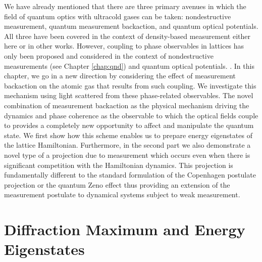 We have already mentioned that there are three primary avenues in
which the field of quantum optics with ultracold gases can be taken:
nondestructive measurement, quantum measurement backaction, and
quantum optical potentials. All three have been covered in the context
of density-based measurement either here or in other works. However,
coupling to phase observables in lattices has only been proposed and
considered in the context of nondestructive measurements (see Chapter
\ref{chap:qnd}) and quantum optical potentials. \cite{caballero2015,
  caballero2015njp, caballero2016, caballero2016a}. In this chapter,
we go in a new direction by considering the effect of measurement
backaction on the atomic gas that results from such coupling.  We
investigate this mechanism using light scattered from these
phase-related observables. The novel combination of measurement
backaction as the physical mechanism driving the dynamics and phase
coherence as the observable to which the optical fields couple to
provides a completely new opportunity to affect and manipulate the
quantum state. We first show how this scheme enables us to prepare
energy eigenstates of the lattice Hamiltonian. Furthermore, in the
second part we also demonstrate a novel type of a projection due to
measurement which occurs even when there is significant competition
with the Hamiltonian dynamics. This projection is fundamentally
different to the standard formulation of the Copenhagen postulate
projection or the quantum Zeno effect \cite{misra1977, facchi2008,
  raimond2010, raimond2012, signoles2014} thus providing an extension
of the measurement postulate to dynamical systems subject to weak
measurement.


\section{Diffraction Maximum and Energy Eigenstates}

